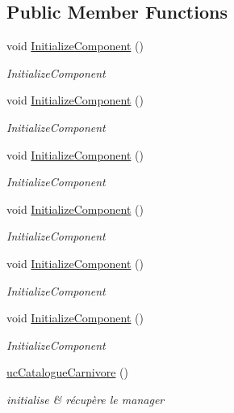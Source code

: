 \subsection*{Public Member Functions}
\begin{DoxyCompactItemize}
\item 
void \hyperlink{classnewPizza1_1_1ucCatalogueCarnivore_ae3fbe460c9b1305f8cd5d685e12746ae}{Initialize\+Component} ()
\begin{DoxyCompactList}\small\item\em Initialize\+Component \end{DoxyCompactList}\item 
void \hyperlink{classnewPizza1_1_1ucCatalogueCarnivore_ae3fbe460c9b1305f8cd5d685e12746ae}{Initialize\+Component} ()
\begin{DoxyCompactList}\small\item\em Initialize\+Component \end{DoxyCompactList}\item 
void \hyperlink{classnewPizza1_1_1ucCatalogueCarnivore_ae3fbe460c9b1305f8cd5d685e12746ae}{Initialize\+Component} ()
\begin{DoxyCompactList}\small\item\em Initialize\+Component \end{DoxyCompactList}\item 
void \hyperlink{classnewPizza1_1_1ucCatalogueCarnivore_ae3fbe460c9b1305f8cd5d685e12746ae}{Initialize\+Component} ()
\begin{DoxyCompactList}\small\item\em Initialize\+Component \end{DoxyCompactList}\item 
void \hyperlink{classnewPizza1_1_1ucCatalogueCarnivore_ae3fbe460c9b1305f8cd5d685e12746ae}{Initialize\+Component} ()
\begin{DoxyCompactList}\small\item\em Initialize\+Component \end{DoxyCompactList}\item 
void \hyperlink{classnewPizza1_1_1ucCatalogueCarnivore_ae3fbe460c9b1305f8cd5d685e12746ae}{Initialize\+Component} ()
\begin{DoxyCompactList}\small\item\em Initialize\+Component \end{DoxyCompactList}\item 
\hyperlink{classnewPizza1_1_1ucCatalogueCarnivore_a0afde1bb81e57eae28e9506ce89e0cf6}{uc\+Catalogue\+Carnivore} ()
\begin{DoxyCompactList}\small\item\em initialise \& récupère le manager \end{DoxyCompactList}\end{DoxyCompactItemize}
